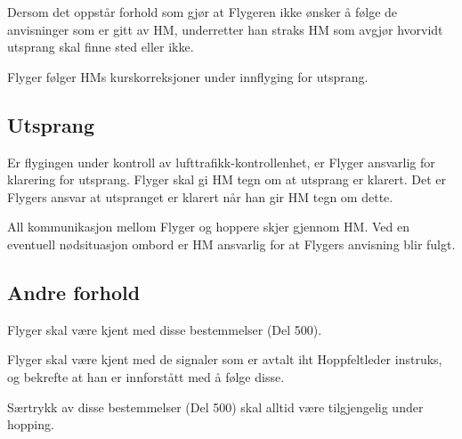 Dersom det oppstår forhold som gjør at Flygeren ikke ønsker å følge de anvisninger som er gitt av HM, underretter han straks HM som avgjør hvorvidt utsprang skal finne sted eller ikke.

Flyger følger HMs kurskorreksjoner under innflyging for utsprang.

\subsection{Utsprang}
Er flygingen under kontroll av lufttrafikk-kontrollenhet, er Flyger ansvarlig for klarering for utsprang. Flyger skal gi HM tegn om at utsprang er klarert. Det er Flygers ansvar at utspranget er klarert når han gir HM tegn om dette.

All kommunikasjon mellom Flyger og hoppere skjer gjennom HM. Ved en eventuell nødsituasjon ombord er HM ansvarlig for at Flygers anvisning blir fulgt.

\subsection{Andre forhold}
Flyger skal være kjent med disse bestemmelser (Del 500).

Flyger skal være kjent med de signaler som er avtalt iht Hoppfeltleder instruks, og bekrefte at han er innforstått med å følge disse.

Særtrykk av disse bestemmelser (Del 500) skal alltid være tilgjengelig under hopping.
